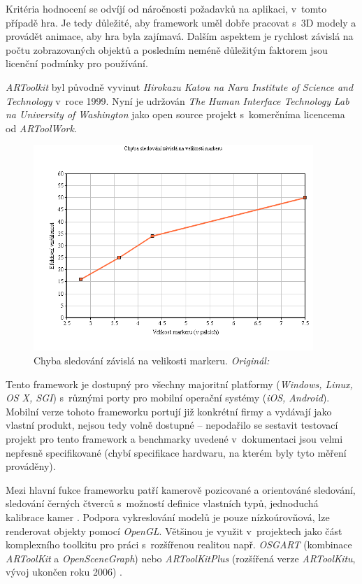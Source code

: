 \documentclass[twoside,12pt]{article}
\begin{document}
% 
\newpage 


Kritéria hodnocení se odvíjí od náročnosti požadavků na aplikaci, v~tomto případě hra. Je tedy důležité, aby framework uměl dobře pracovat s~3D modely a provádět animace, aby hra byla zajímavá. Dalším aspektem je rychlost závislá na počtu zobrazovaných objektů a posledním neméně důležitým faktorem jsou licenční podmínky pro používání.


\textit{ARToolkit} byl původně vyvinut \textit{Hirokazu Katou na Nara Institute of Science and Technology} v~roce 1999. Nyní je udržován \textit{The Human Interface Technology Lab na University of Washington} jako open source projekt s~komerčníma licencema od \textit{ARToolWork}.

\begin{figure}[H]
    \includegraphics[width=400px, center]{images/artoolkit_benchmark.png}
    \caption[]{Chyba sledování závislá na velikosti markeru. \textit{Originál: \cite{artoolkit_benchmark}}}
    \label{artoolkit_benchmark}
\end{figure}
 Tento framework je dostupný pro všechny majoritní platformy (\textit{Windows, Linux, OS X, SGI}) s~různými porty pro mobilní operační systémy (\textit{iOS, Android}). Mobilní verze tohoto frameworku portují již konkrétní firmy a vydávají jako vlastní produkt, nejsou tedy volně dostupné -- nepodařilo se sestavit testovací projekt pro tento framework a benchmarky uvedené v~dokumentaci jsou velmi nepřesně specifikované (chybí specifikace hardwaru, na kterém byly tyto měření prováděny). 

Mezi hlavní fukce frameworku patří kamerově pozicované a orientováné sledování, sledování černých čtverců s~možností definice vlastních typů, jednoduchá kalibrace kamer \cite{artoolkit_features}. Podpora vykreslování modelů je pouze nízkoúrovňová, lze renderovat objekty pomocí \textit{OpenGL}. Většinou je využit v~projektech jako část komplexního toolkitu pro práci s~rozšířenou realitou např. \textit{OSGART} (kombinace \textit{ARToolKit} a \textit{OpenSceneGraph}) \cite{osgart} nebo \textit{ARToolKitPlus} (rozšířená verze \textit{ARToolKitu}, vývoj ukončen roku 2006) \cite{wagner_schmalstieg}. 
\end{document}
